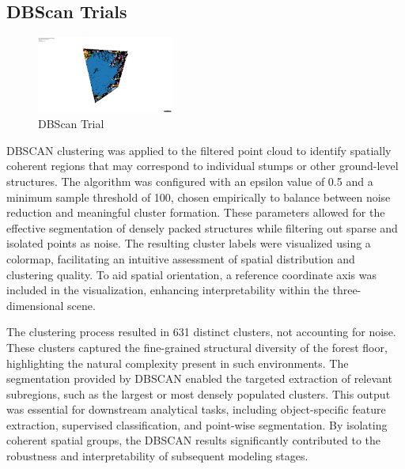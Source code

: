 \documentclass[../report.tex]{subfiles}
\begin{document}
    \subsection{DBScan Trials}
    \begin{figure}[H]
        \centering
        \includegraphics[width=0.4\textwidth]{rnd-project-report-main/figures/clustered_output_with_scale.jpg}
        \caption{DBScan Trial}
    \end{figure}
    DBSCAN clustering was applied to the filtered point cloud to identify spatially coherent regions that may correspond to individual stumps or other ground-level structures. The algorithm was configured with an epsilon value of 0.5 and a minimum sample threshold of 100, chosen empirically to balance between noise reduction and meaningful cluster formation. These parameters allowed for the effective segmentation of densely packed structures while filtering out sparse and isolated points as noise. The resulting cluster labels were visualized using a colormap, facilitating an intuitive assessment of spatial distribution and clustering quality. To aid spatial orientation, a reference coordinate axis was included in the visualization, enhancing interpretability within the three-dimensional scene.

    The clustering process resulted in 631 distinct clusters, not accounting for noise. These clusters captured the fine-grained structural diversity of the forest floor, highlighting the natural complexity present in such environments. The segmentation provided by DBSCAN enabled the targeted extraction of relevant subregions, such as the largest or most densely populated clusters. This output was essential for downstream analytical tasks, including object-specific feature extraction, supervised classification, and point-wise segmentation. By isolating coherent spatial groups, the DBSCAN results significantly contributed to the robustness and interpretability of subsequent modeling stages.
\end{document}
